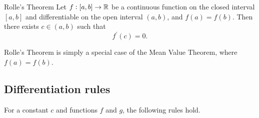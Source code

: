 \begin{thrm}{Rolle's Theorem}{}
Let $f:[a,b]\to\mathbb R$ be a continuous function on the closed interval $[a,b]$ and differentiable on the open interval $(a,b)$, and $f(a)=f(b)$. Then there exists $c \in (a,b)$ such that 
\[ f^\prime(c)=0. \]
\end{thrm}
\begin{remark}
Rolle's Theorem is simply a special case of the Mean Value Theorem, where $f(a)=f(b)$.
\end{remark}

\subsection{Differentiation rules}
For a constant $c$ and functions $f$ and $g$, the following rules hold.

